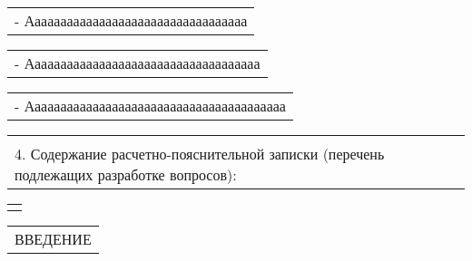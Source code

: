 \documentclass[12pt, А4, twoside]{article}
\begin{document}
\begin{FlushLeft}
    \vspace{-0.1 cm}

    \begin{tabular}{p{17.25cm}}
        \hspace{0.6cm} \textsf{- Аааааааааааааааааааааааааааааааааа}\vspace{0pt} \hline \\
    \end{tabular}

    \vspace{-0.1 cm}

    \begin{tabular}{p{17.25cm}}
        \hspace{0.6cm} \textsf{- Аааааааааааааааааааааааааааааааааааа}\vspace{0pt} \hline 
    \end{tabular}

    \vspace{-0.1 cm}

    \begin{tabular}{p{17.25cm}}
        \hspace{0.6cm} \textsf{- Аааааааааааааааааааааааааааааааааааааааа}\vspace{0pt} \hline 
    \end{tabular}

    \vspace{-0.1 cm}

    \begin{tabular}{p{17.25cm}}
        \vspace{0.1cm} \hline \\
        \textsf{4. Содержание расчетно-пояснительной записки (перечень подлежащих разработке вопросов):} \vspace{0pt} \hline \\
    \end{tabular}

    \begin{tabular}{p{17.25cm}}
        \vspace{0pt} \hline \\
    \end{tabular}

    \vspace{-0.1 cm}

    \begin{tabular}{p{17.25cm}}
        \hspace{0.3cm} \textsf{ВВЕДЕНИЕ} \vspace{0pt} \hline \\
    \end{tabular}


\end{FlushLeft}
\end{document}
